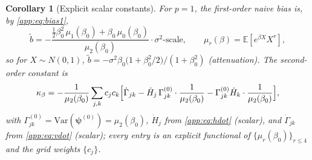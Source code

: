 \documentclass[11pt]{article}
\theoremstyle{plain}
\newtheorem{corollary}{Corollary}
\theoremstyle{definition}
\newcommand{\E}{\mathbb{E}}
\newcommand{\Var}{\mathrm{Var}}
\begin{document}
\begin{corollary}[Explicit scalar constants]\label{app:cor:scalar}
For $p=1$, the first-order naive bias is, by \eqref{app:eq:bias1},
\[
  \tilde b=-\frac{\tfrac12\beta_0^{2}\,\mu_1(\beta_0)
        +\beta_0\,\mu_0(\beta_0)}{\mu_2(\beta_0)}\cdot\sigma^2\text{-scale},
  \qquad \mu_r(\beta)=\E[e^{\beta X}X^r],
\]
so for $X\sim N(0,1)$,
$\tilde b=-\sigma^2\beta_0\bigl(1+\beta_0^2/2\bigr)/(1+\beta_0^2)$
(attenuation). The second-order constant is
\[
  \kappa_\beta
  =-\frac{1}{\mu_2(\beta_0)}
   \sum_{j,k}c_jc_k\Bigl[
     \dot\Gamma_{jk}
     -\dot H_j\,\Gamma_{jk}^{(0)}\cdot\frac{1}{\mu_2(\beta_0)}
     -\Gamma_{jk}^{(0)}\dot H_k\cdot\frac{1}{\mu_2(\beta_0)}
   \Bigr],
\]
with $\Gamma_{jk}^{(0)}=\Var(\bm\psi^{(0)})=\mu_2(\beta_0)$,
$\dot H_j$ from \eqref{app:eq:hdot} (scalar), and $\dot\Gamma_{jk}$ from
\eqref{app:eq:vdot} (scalar); every entry is an explicit functional of
$\{\mu_r(\beta_0)\}_{r\le4}$ and the grid weights $\{c_j\}$.
\end{corollary}
\end{document}
